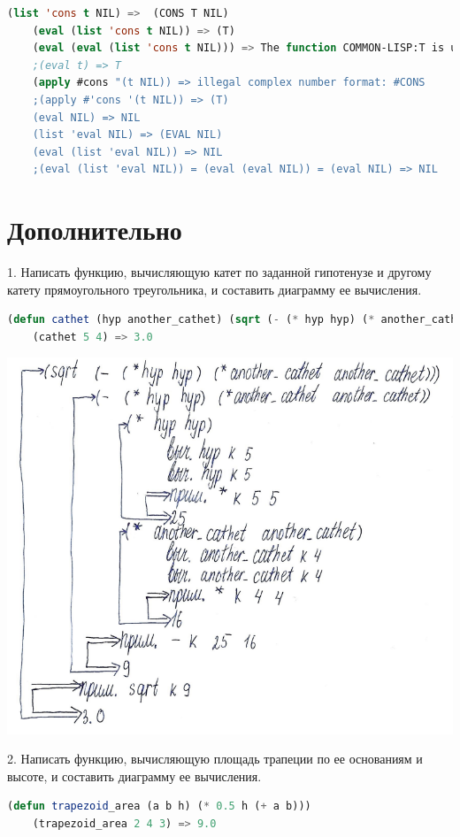\documentclass[12pt]{report}
\begin{document}
\begin{lstlisting}[language=Lisp]
	(list 'cons t NIL) =>  (CONS T NIL)
	(eval (list 'cons t NIL)) => (T)
	(eval (eval (list 'cons t NIL))) => The function COMMON-LISP:T is undefined
	;(eval t) => T
	(apply #cons "(t NIL)) => illegal complex number format: #CONS
	;(apply #'cons '(t NIL)) => (T)
	(eval NIL) => NIL
	(list 'eval NIL) => (EVAL NIL) 
	(eval (list 'eval NIL)) => NIL
	;(eval (list 'eval NIL)) = (eval (eval NIL)) = (eval NIL) => NIL
\end{lstlisting}

\section*{Дополнительно}

1. Написать функцию, вычисляющую катет по заданной гипотенузе и другому катету  прямоугольного треугольника, и составить диаграмму ее вычисления.

\begin{lstlisting}[language=Lisp]
	(defun cathet (hyp another_cathet) (sqrt (- (* hyp hyp) (* another_cathet another_cathet))))
	(cathet 5 4) => 3.0
\end{lstlisting}

\includegraphics[scale=1.2]{img/d1}

2. Написать функцию, вычисляющую площадь трапеции по ее основаниям и высоте, и составить диаграмму ее вычисления.

\begin{lstlisting}[language=Lisp]
	(defun trapezoid_area (a b h) (* 0.5 h (+ a b)))
	(trapezoid_area 2 4 3) => 9.0
\end{lstlisting}
\end{document}
